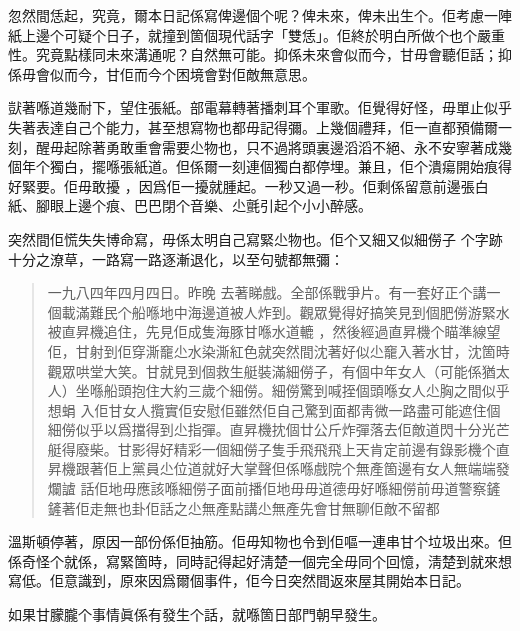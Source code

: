 忽然間恁起，究竟，爾本日記係寫俾邊個个呢？俾未來，俾未出生个。佢考慮一陣紙上邊个可疑个日子，就撞到箇個現代話字「雙恁」。佢終於明白所做个也个嚴重性。究竟點樣同未來溝通呢？自然無可能。抑係未來會似而今，甘毋會聽佢話；抑係毋會似而今，甘佢而今个困境會對佢敵無意思。

獃著喺道幾耐下，望住張紙。部電幕轉著播刺耳个軍歌。佢覺得好怪，毋單止似乎失著表達自己个能力，甚至想寫物也都毋記得彌。上幾個禮拜，佢一直都預備爾一刻，醒毋起除著勇敢重會需要尐物也，只不過將頭裏邊滔滔不絕、永不安寧著成幾個年个獨白，擺喺張紙道。但係爾一刻連個獨白都停埋。兼且，佢个潰瘍開始痕得好緊要。佢毋敢擾
，因爲佢一擾就腫起。一秒又過一秒。佢剩係留意前邊張白紙、腳眼上邊个痕、巴巴閉个音樂、尐氈引起个小小醉感。

突然間佢慌失失博命寫，毋係太明自己寫緊尐物也。佢个又細又似細僗子
个字跡十分之潦草，一路寫一路逐漸退化，以至句號都無彌：
\begin{quote}
一九八四年四月四日。昨晚
去著睇戲。全部係戰爭片。有一套好正个講一個載滿難民个船喺地中海邊道被人炸到。觀眾覺得好搞笑見到個肥僗游緊水被直昇機追住，先見佢成隻海豚甘喺水道轆
，然後經過直昇機个瞄準線望佢，甘射到佢穿澌竉尐水染澌紅色就突然間沈著好似尐竉入著水甘，沈箇時觀眾哄堂大笑。甘就見到個救生艇裝滿細僗子，有個中年女人（可能係猶太人）坐喺船頭抱住大約三歲个細僗。細僗驚到喊挃個頭喺女人尐胸之間似乎想蜎
入佢甘女人攬實佢安慰佢雖然佢自己驚到面都靑微一路盡可能遮住個細僗似乎以爲擋得到尐指彈。直昇機抌個廿公斤炸彈落去佢敵道閃十分光芒艇得廢柴。甘影得好精彩一個細僗子隻手飛飛飛上天肯定前邊有錄影機个直昇機跟著佢上黨員尐位道就好大掌聲但係喺戲院个無產箇邊有女人無端端發爛謯
話佢地毋應該喺細僗子面前播佢地毋毋道德毋好喺細僗前毋道警察鏟鏟著佢走無也卦佢話之尐無產點講尐無產先會甘無聊佢敵不留都
\end{quote}
溫斯頓停著，原因一部份係佢抽筋。佢毋知物也令到佢嘔一連串甘个垃圾出來。但係奇怪个就係，寫緊箇時，同時記得起好淸楚一個完全毋同个回憶，淸楚到就來想寫低。佢意識到，原來因爲爾個事件，佢今日突然間返來屋其開始本日記。

如果甘朦朧个事情眞係有發生个話，就喺箇日部門朝早發生。

